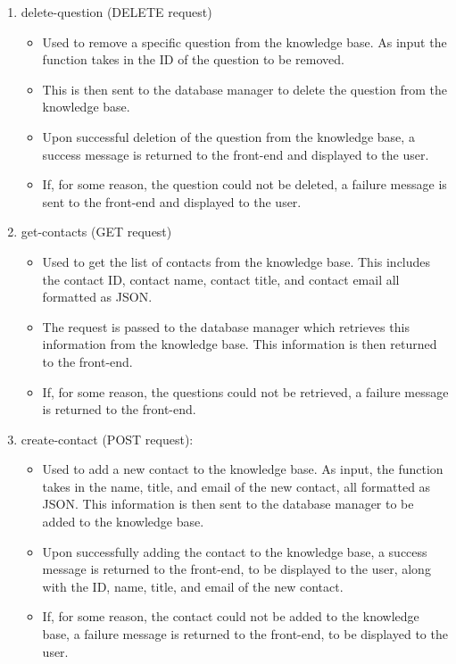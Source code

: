 \documentclass[titlepage, 12pt]{article}
\begin{document}
\begin{enumerate}
\begin{itemize}
    \end{itemize}
    \item delete-question (DELETE request)
    \begin{itemize}
        \item Used to remove a specific question from the knowledge base. As input the function takes in the ID of the question to be removed.
        \item This is then sent to the database manager to delete the question from the knowledge base.
        \item Upon successful deletion of the question from the knowledge base, a success message is returned to the front-end and displayed to the user.
        \item If, for some reason, the question could not be deleted, a failure message is sent to the front-end and displayed to the user.
    \end{itemize}
    \item get-contacts (GET request)
    \begin{itemize}
        \item Used to get the list of contacts from the knowledge base. This includes the contact ID, contact name, contact title, and contact email all formatted as JSON.
        \item The request is passed to the database manager which retrieves this information from the knowledge base. This information is then returned to the front-end.
        \item If, for some reason, the questions could not be retrieved, a failure message is returned to the front-end.
    \end{itemize}
    \item create-contact (POST request):
    \begin{itemize}
        \item Used to add a new contact to the knowledge base. As input, the function takes in the name, title, and email of the new contact, all formatted as JSON.
        This information is then sent to the database manager to be added to the knowledge base.
        \item Upon successfully adding the contact to the knowledge base, a success message is returned to the front-end, to be displayed to the user, along with the ID, name, title, and email of the new contact. 
        \item If, for some reason, the contact could not be added to the knowledge base, a failure message is returned to the front-end, to be displayed to the user.

\end{itemize}
\end{enumerate}
\end{document}
